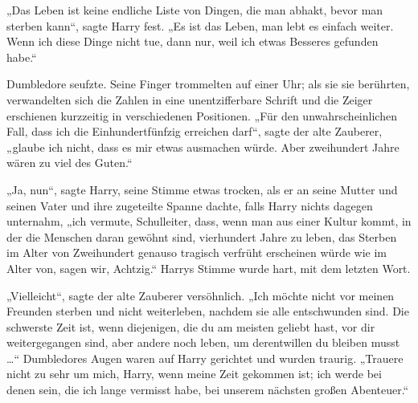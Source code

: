 „Das Leben ist keine endliche Liste von Dingen, die man abhakt, bevor man sterben kann“, sagte Harry fest.
„Es ist das Leben, man lebt es einfach weiter. Wenn ich diese Dinge nicht tue, dann nur, weil ich etwas Besseres gefunden habe.“

Dumbledore seufzte. Seine Finger trommelten auf einer Uhr; als sie sie berührten, verwandelten sich die Zahlen in eine unentzifferbare Schrift und die Zeiger erschienen kurzzeitig in verschiedenen Positionen.
„Für den unwahrscheinlichen Fall, dass ich die Einhundertfünfzig erreichen darf“, sagte der alte Zauberer, „glaube ich nicht, dass es mir etwas ausmachen würde. Aber zweihundert Jahre wären zu viel des Guten.“

„Ja, nun“, sagte Harry, seine Stimme etwas trocken, als er an seine Mutter und seinen Vater und ihre zugeteilte Spanne dachte, falls Harry nichts dagegen unternahm, „ich vermute, Schulleiter, dass, wenn man aus einer Kultur kommt, in der die Menschen daran gewöhnt sind, vierhundert Jahre zu leben, das Sterben im Alter von Zweihundert genauso tragisch verfrüht erscheinen würde wie im Alter von, sagen wir, Achtzig.“ Harrys Stimme wurde hart, mit dem letzten Wort.

„Vielleicht“, sagte der alte Zauberer versöhnlich.
„Ich möchte nicht vor meinen Freunden sterben und nicht weiterleben, nachdem sie alle entschwunden sind. Die schwerste Zeit ist, wenn diejenigen, die du am meisten geliebt hast, vor dir weitergegangen sind, aber andere noch leben, um derentwillen du bleiben musst …“ Dumbledores Augen waren auf Harry gerichtet und wurden traurig.
„Trauere nicht zu sehr um mich, Harry, wenn meine Zeit gekommen ist; ich werde bei denen sein, die ich lange vermisst habe, bei unserem nächsten großen Abenteuer.“


